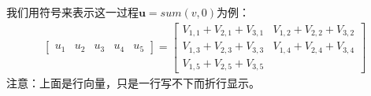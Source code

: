 我们用符号来表示这一过程$\boldsymbol{u}=sum(v, 0)$为例：
\begin{equation}
\begin{aligned}
\begin{bmatrix}
	u_{1} & u_{2} & u_{3} & u_{4} & u_{5}
\end{bmatrix}=\begin{bmatrix}
	V_{1,1}+V_{2,1}+V_{3,1} & V_{1,2}+V_{2,2}+V_{3,2} \\
	V_{1,3}+V_{2,3}+V_{3,3} & V_{1,4}+V_{2,4}+V_{3,4} \\
	V_{1,5}+V_{2,5}+V_{3,5}
\end{bmatrix}
\end{aligned}
\label{chpZ01-sum-dim-0-u-V}
\end{equation}
注意：上面是行向量，只是一行写不下而折行显示。